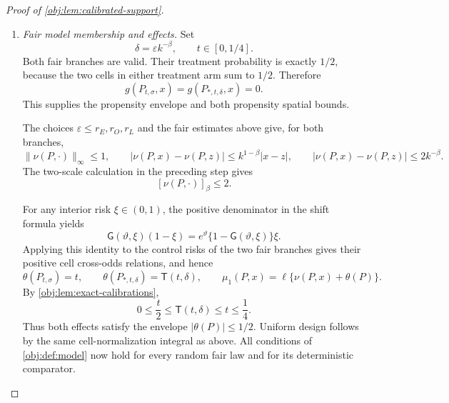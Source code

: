 \begin{proof}[Proof of \cref{obj:lem:calibrated-support}]
\begin{enumerate}
To convert the spatial bounds into the required Hölder bounds, let
\(f:[0,1]\to\mathbb R\), \(0<\gamma\le1\), satisfy
\[
|f(x)-f(z)|\le k^{1-\gamma}|x-z|,
\qquad
|f(x)-f(z)|\le2k^{-\gamma}.
\]
Set
\[
d_{xz}=|x-z|\ge0.
\]
If \(kd_{xz}\le1\), then
\[
|f(x)-f(z)|
\le k^{-\gamma}(kd_{xz})
\le k^{-\gamma}(kd_{xz})^\gamma
=d_{xz}^\gamma.
\]
If \(kd_{xz}\ge1\), then
\[
|f(x)-f(z)|
\le2k^{-\gamma}
\le2k^{-\gamma}(kd_{xz})^\gamma
=2d_{xz}^\gamma.
\]
The first case includes \(x=z\), and both cases include \(\gamma=1\). Thus
\[
[f]_\gamma\le2.
\]
Apply this argument to \(g\) with \(\gamma=\alpha\) and to \(\nu\) with
\(\gamma=\beta\). Together with uniform design, homogeneity, and the three envelopes, these are precisely the conditions of
\cref{obj:def:model}. Hence both mixed laws belong to
\(\mathcal M(\alpha,\beta)\).

\item \textit{Fair model membership and effects.}
Set
\[
\delta=\varepsilon k^{-\beta},
\qquad t\in[0,1/4].
\]
Both fair branches are valid. Their treatment probability is exactly \(1/2\), because the two cells in either treatment arm sum to \(1/2\). Therefore
\[
g(P_{t,\sigma},x)=g(P_{*,t,\delta},x)=0.
\]
This supplies the propensity envelope and both propensity spatial bounds.

The choices \(\varepsilon\le r_E,r_O,r_L\) and the fair estimates above give, for both branches,
\[
\|\nu(P,\cdot)\|_\infty\le1,\qquad
|\nu(P,x)-\nu(P,z)|\le k^{1-\beta}|x-z|,
\qquad
|\nu(P,x)-\nu(P,z)|\le2k^{-\beta}.
\]
The two-scale calculation in the preceding step gives
\[
[\nu(P,\cdot)]_\beta\le2.
\]

For any interior risk \(\xi\in(0,1)\), the positive denominator in the shift formula yields
\[
\mathsf G(\vartheta,\xi)(1-\xi)
=e^\vartheta\{1-\mathsf G(\vartheta,\xi)\}\xi.
\]
Applying this identity to the control risks of the two fair branches gives their positive cell cross-odds relations, and hence
\[
\theta(P_{t,\sigma})=t,\qquad
\theta(P_{*,t,\delta})=\mathsf T(t,\delta),
\qquad
\mu_1(P,x)=\ell\{\nu(P,x)+\theta(P)\}.
\]
By \cref{obj:lem:exact-calibrations},
\[
0\le\frac t2\le\mathsf T(t,\delta)\le t\le\frac14.
\]
Thus both effects satisfy the envelope \( |\theta(P)|\le1/2 \).
Uniform design follows by the same cell-normalization integral as above.
All conditions of \cref{obj:def:model} now hold for every random fair law and for its deterministic comparator.


\end{enumerate}
\end{proof}
